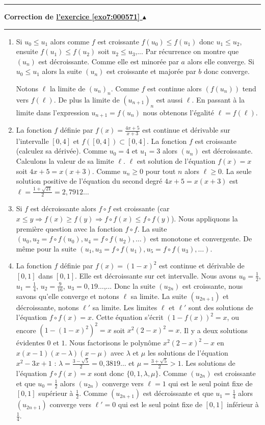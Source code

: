 \documentclass[11pt,a4paper]{article}
\newcounter{exo}
\newcommand{\correction}[1]{\hypertarget{cor7:#1}{}\label{cor7:#1}{\bf Correction de \hyperlink{exo7:#1}{l'exercice \ref{exo7:#1} $\blacktriangle$}}\vspace{1mm}\hrule\vspace{1mm}}
\newcommand{\fincorrection}{\vspace{1mm}\hrule\vspace*{7mm}}
\begin{document}
\fincorrection
\correction{000571}
\begin{enumerate}
    \item Si $u_0 \leqslant u_1$ alors comme $f$ est croissante $f(u_0)\leqslant f(u_1)$ donc $u_1 \leqslant u_2$, ensuite $f(u_1)\leqslant f(u_2)$ soit $u_2 \leqslant u_3$,... Par r\'ecurrence on montre que $(u_n)$ est d\'ecroissante. Comme elle est minor\'ee par $a$ alors elle converge. Si $u_0 \leqslant u_1$ alors la suite $(u_n)$ est croissante et major\'ee par $b$ donc converge.

Notons $\ell$ la limite de $(u_n)_n$. Comme $f$ est continue alors
$(f(u_n))$ tend vers $f(\ell)$. De plus la limite de $(u_{n+1})_n$
est aussi $\ell$. En passant \`a la limite dans l'expression
$u_{n+1}=f(u_n)$ nous obtenons l'\'egalit\'e $\ell = f(\ell)$.

  \item La fonction $f$ définie par $f(x) = \frac{4x+5}{x+3}$ est continue et d\'erivable sur l'intervalle $[0,4]$ et $f([0,4])\subset [0,4]$.
La fonction $f$ est croissante (calculez sa d\'eriv\'ee). Comme $u_0 =
4$ et $u_1= 3$ alors $(u_n)$ est d\'ecroissante. Calculons la valeur
de sa limite $\ell$. $\ell$ est solution de l'\'equation $f(x)=x$
soit $4x+5=x(x+3)$. Comme $u_n \geqslant 0$ pour tout $n$ alors $\ell
\geqslant 0$. La seule solution positive de l'équation du second degré $4x+5=x(x+3)$ est $\ell =
\frac{1+\sqrt{21}}{2}=2,7912\ldots$

  \item Si $f$ est d\'ecroissante alors $f\circ f$ est croissante (car $x\leqslant y \Rightarrow
f(x)\geqslant f(y) \Rightarrow f\circ f(x)\leqslant  f\circ f(y)$). Nous
appliquons la premi\`ere question avec la fonction $f\circ f$. La
suite $(u_0, u_2 = f\circ f(u_0),u_4 = f\circ f(u_2),\ldots)$ est
monotone et convergente. De m\^eme pour la suite $(u_1, u_3 =
f\circ f(u_1),u_5 = f\circ f(u_3),\ldots)$.

  \item La fonction $f$ définie par $f(x) = (1-x)^2$ est continue et d\'erivable de $[0,1]$ dans $[0,1]$.
Elle est d\'ecroissante sur cet intervalle. Nous avons $u_0 =
\frac12$, $u_1=\frac14$, $u_2=\frac{9}{16}$, $u_3 =
0,19\ldots$,... Donc la suite $(u_{2n})$ est croissante, nous
savons qu'elle converge et notons $\ell$ sa limite. La suite
$(u_{2n+1})$ et d\'ecroissante,  notons $\ell'$ sa limite. Les
limites $\ell$ et $\ell'$ sont des solutions de l'\'equation
$f\circ f(x)=x$. Cette \'equation s'\'ecrit $(1-f(x))^2=x$, ou encore
$(1-(1-x)^2)^2=x$ soit $x^2(2-x)^2=x$. Il y a deux solutions
\'evidentes $0$ et $1$. Nous factorisons le polyn\^ome
$x^2(2-x)^2-x$ en $x(x-1)(x-\lambda)(x-\mu)$ avec $\lambda$ et
$\mu$ les solutions de l'\'equation $x^2-3x+1$ : $\lambda =
\frac{3-\sqrt{5}}{2} = 0,3819\ldots$ et $\mu =
\frac{3+\sqrt{5}}{2} > 1$. Les solutions de l'\'equation $f\circ
f(x)=x$ sont donc $\{ 0,1,\lambda, \mu\}$. Comme $(u_{2n})$ est
croissante et que $u_0 = \frac12$ alors  $(u_{2n})$ converge vers
$\ell=1$ qui est le seul point fixe de $[0,1]$ sup\'erieur \`a
$\frac12$. Comme $(u_{2n+1})$ est d\'ecroissante et que $u_1 =
\frac14$ alors  $(u_{2n+1})$ converge vers $\ell'=0$ qui est le
seul point fixe de $[0,1]$ inf\'erieur \`a $\frac14$.
\end{enumerate}
\end{document}
